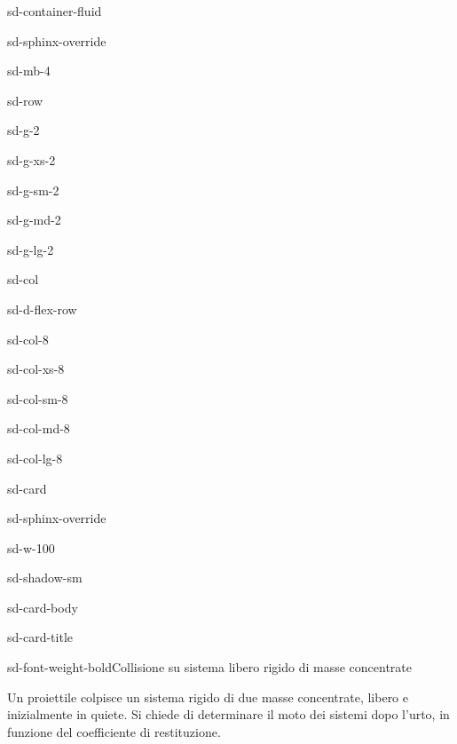 \documentclass[letterpaper,10pt,italian]{jupyterBook}
\begin{document}
\begin{sphinxuseclass}{sd-container-fluid}
\begin{sphinxuseclass}{sd-sphinx-override}
\begin{sphinxuseclass}{sd-mb-4}
\begin{sphinxuseclass}{sd-row}
\begin{sphinxuseclass}{sd-g-2}
\begin{sphinxuseclass}{sd-g-xs-2}
\begin{sphinxuseclass}{sd-g-sm-2}
\begin{sphinxuseclass}{sd-g-md-2}
\begin{sphinxuseclass}{sd-g-lg-2}
\begin{sphinxuseclass}{sd-col}
\begin{sphinxuseclass}{sd-d-flex-row}
\begin{sphinxuseclass}{sd-col-8}
\begin{sphinxuseclass}{sd-col-xs-8}
\begin{sphinxuseclass}{sd-col-sm-8}
\begin{sphinxuseclass}{sd-col-md-8}
\begin{sphinxuseclass}{sd-col-lg-8}
\begin{sphinxuseclass}{sd-card}
\begin{sphinxuseclass}{sd-sphinx-override}
\begin{sphinxuseclass}{sd-w-100}
\begin{sphinxuseclass}{sd-shadow-sm}
\begin{sphinxuseclass}{sd-card-body}
\begin{sphinxuseclass}{sd-card-title}
\begin{sphinxuseclass}{sd-font-weight-bold}Collisione su sistema libero rigido di masse concentrate
\end{sphinxuseclass}
\end{sphinxuseclass}
\sphinxAtStartPar
Un proiettile colpisce un sistema rigido di due masse concentrate, libero e inizialmente in quiete. Si chiede di determinare il moto dei sistemi dopo l’urto, in funzione del coefficiente di restituzione.


\end{sphinxuseclass}
\end{sphinxuseclass}
\end{sphinxuseclass}
\end{sphinxuseclass}
\end{sphinxuseclass}
\end{sphinxuseclass}
\end{sphinxuseclass}
\end{sphinxuseclass}
\end{sphinxuseclass}
\end{sphinxuseclass}
\end{sphinxuseclass}
\end{sphinxuseclass}
\end{sphinxuseclass}
\end{sphinxuseclass}
\end{sphinxuseclass}
\end{sphinxuseclass}
\end{sphinxuseclass}
\end{sphinxuseclass}
\end{sphinxuseclass}
\end{sphinxuseclass}
\end{sphinxuseclass}
\end{document}
